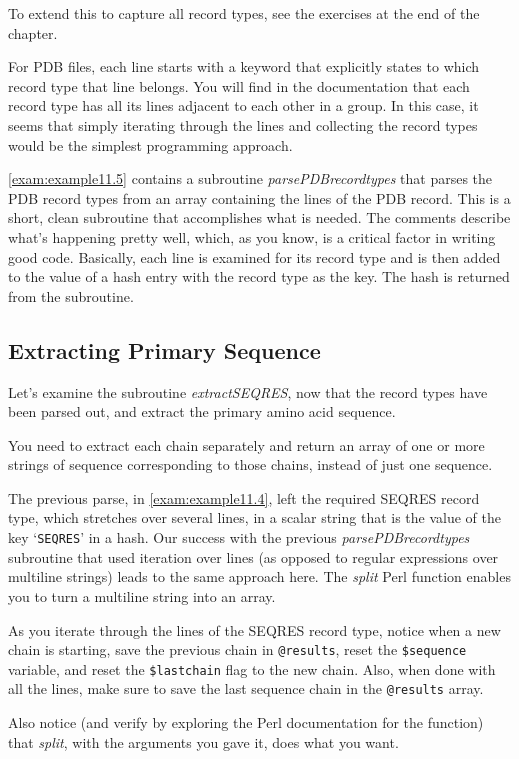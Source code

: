 To extend this to capture all record types, see the exercises at the end of the chapter.

For PDB files, each line starts with a keyword that explicitly states to which record type that line belongs. You will find in the documentation that each record type has all its lines adjacent to each other in a group. In this case, it seems that simply iterating through the lines and collecting the record types would be the simplest programming approach.

\autoref{exam:example11.5} contains a subroutine \textit{parsePDBrecordtypes} that parses the PDB record types from an array containing the lines of the PDB record. This is a short, clean subroutine that accomplishes what is needed. The comments describe what's happening pretty well, which, as you know, is a critical factor in writing good code. Basically, each line is examined for its record type and is then added to the value of a hash entry with the record type as the key. The hash is returned from the subroutine. 

\subsection{Extracting Primary Sequence}
Let's examine the subroutine \textit{extractSEQRES}, now that the record types have been parsed out, and extract the primary amino acid sequence.

You need to extract each chain separately and return an array of one or more strings of sequence corresponding to those chains, instead of just one sequence.

The previous parse, in \autoref{exam:example11.4}, left the required SEQRES record type, which stretches over several lines, in a scalar string that is the value of the key `\verb|SEQRES|' in a hash. Our success with the previous \textit{parsePDBrecordtypes} subroutine that used iteration over lines (as opposed to regular expressions over multiline strings) leads to the same approach here. The \textit{split} Perl function enables you to turn a multiline string into an array.

As you iterate through the lines of the SEQRES record type, notice when a new chain is starting, save the previous chain in \verb|@results|, reset the \verb|$sequence| variable, and reset the \verb|$lastchain| flag to the new chain. Also, when done with all the lines, make sure to save the last sequence chain in the \verb|@results| array.

Also notice (and verify by exploring the Perl documentation for the function) that \textit{split}, with the arguments you gave it, does what you want.

